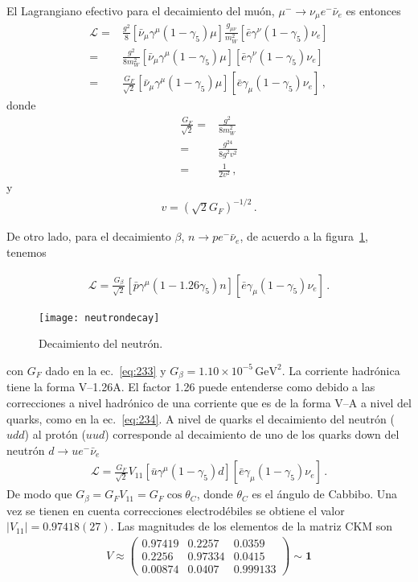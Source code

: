 El Lagrangiano efectivo para el decaimiento del mu\'on, $\mu^-\to \nu_\mu e^- \bar{\nu}_e$ es entonces
\begin{align}
  \mathcal{L}=&\frac{g^2}{8}\left[\bar{\nu}_\mu\gamma^\mu(1-\gamma_5)\mu\right]\frac{g_{\mu\nu}}{m_W^2}
  \left[\bar{e}\gamma^\nu(1-\gamma_5)\nu_e\right]\nonumber\\
=&\frac{g^2}{8m_W^2}\left[\bar{\nu}_\mu\gamma^\mu(1-\gamma_5)\mu\right]
  \left[\bar{e}\gamma^\nu(1-\gamma_5)\nu_e\right]\nonumber\\
  =&\frac{G_F}{\sqrt{2}}\left[\bar{\nu}_\mu\gamma^\mu(1-\gamma_5)\mu\right]\left[\bar{e}\gamma_\mu(1-\gamma_5)\nu_e\right]\,,
\end{align}
donde
\begin{align}
  \frac{G_F}{\sqrt{2}}=&\frac{g^2}{8m_W^2}\nonumber\\
  =&\frac{g^24}{8g^2v^2}\nonumber\\
  =&\frac{1}{2v^2}\,,
\end{align}
y
\begin{align}
  v=\left(\sqrt{2}G_F\right)^{-1/2}\,.
\end{align}


De otro lado, para el  decaimiento $\beta$, $n\to p e^- \bar{\nu}_e$, de acuerdo a la figura~\ref{fig:neutrondecay}, tenemos

\begin{align}
    \mathcal{L}=\frac{G_\beta}{\sqrt{2}}\left[\bar{p}\gamma^\mu(1-1.26\gamma_5)n\right]\left[\bar{e}\gamma_\mu(1-\gamma_5)\nu_e\right]\,.
\end{align}
\begin{figure}
  \centering
  \texttt{[image: neutrondecay]}
  \caption{Decaimiento del neutr\'on.}
  \label{fig:neutrondecay}
\end{figure}
con $G_F$ dado en la ec.~\eqref{eq:233} y $G_\beta=1.10\times10^{-5}\,\text{GeV}^2$. La corriente hadr\'onica tiene la forma V--1.26A. El factor 1.26  puede entenderse como debido a las correcciones a nivel hadr\'onico de una corriente que es de la forma V--A a nivel del quarks, como en la ec.~\eqref{eq:234}. A nivel de quarks el decaimiento del neutr\'on ($udd$) al prot\'on ($uud$) corresponde al decaimiento de uno de los quarks down del neutr\'on $d\to u e^- \bar{\nu}_e$
\begin{align}
    \mathcal{L}=\frac{G_F}{\sqrt{2}}V_{11}\left[\bar{u}\gamma^\mu(1-\gamma_5)d\right]\left[\bar{e}\gamma_\mu(1-\gamma_5)\nu_e\right]\,.
\end{align}
De modo que $G_\beta=G_F V_{11}=G_F\cos\theta_C$, donde $\theta_C$ es el \'angulo de Cabbibo. Una vez se tienen en cuenta correcciones electrod\'ebiles se obtiene el valor $|V_{11}|=0.97418(27)$\cite{PDG}. Las magnitudes de los elementos de la matriz CKM son\cite{PDG}
\begin{align}
  V\approx\begin{pmatrix}
    0.97419&0.2257&0.0359\\
    0.2256&0.97334&0.0415\\
    0.00874&0.0407&0.999133
  \end{pmatrix}\sim \mathbf{1}
\end{align}

